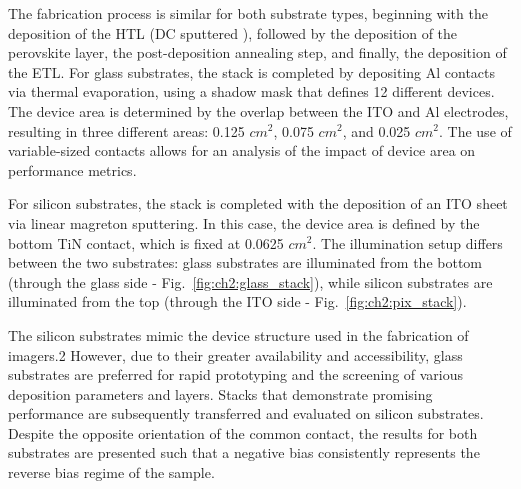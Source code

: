 The fabrication process is similar for both substrate types, beginning with the deposition of the HTL (DC sputtered ), followed by the deposition of the perovskite layer, the post-deposition annealing step, and finally, the deposition of the ETL. For glass substrates, the stack is completed by depositing Al contacts via thermal evaporation, using a shadow mask that defines 12 different devices. The device area is determined by the overlap between the ITO and Al electrodes, resulting in three different areas: 0.125 $cm^2$, 0.075 $cm^2$, and 0.025 $cm^2$. The use of variable-sized contacts allows for an analysis of the impact of device area on performance metrics.

For silicon substrates, the stack is completed with the deposition of an ITO sheet via linear magreton sputtering. In this case, the device area is defined by the bottom TiN contact, which is fixed at 0.0625 $cm^2$. The illumination setup differs between the two substrates: glass substrates are illuminated from the bottom (through the glass side - Fig.~\ref{fig:ch2:glass_stack}), while silicon substrates are illuminated from the top (through the ITO side - Fig.~\ref{fig:ch2:pix_stack}). 

The silicon substrates mimic the device structure used in the fabrication of imagers.2 However, due to their greater availability and accessibility, glass substrates are preferred for rapid prototyping and the screening of various deposition parameters and layers. Stacks that demonstrate promising performance are subsequently transferred and evaluated on silicon substrates. Despite the opposite orientation of the common contact, the results for both substrates are presented such that a negative bias consistently represents the reverse bias regime of the sample.


